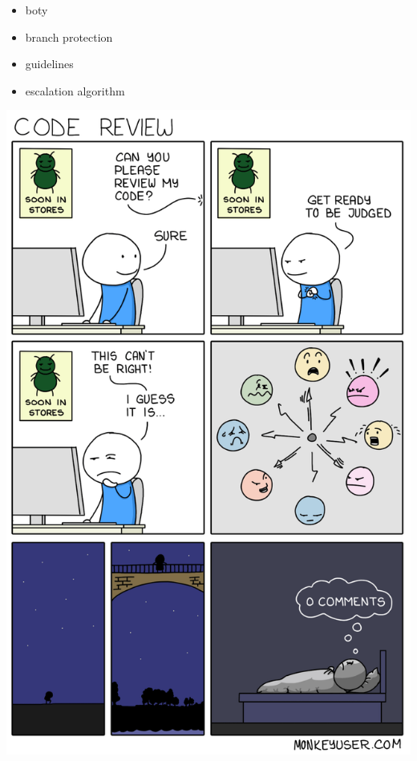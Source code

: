 \documentclass[xcolor=dvipsnames]{beamer}%
\begin{document}
\begin{frame}
	\begin{itemize}
		\item boty
		\item branch protection
		\item guidelines
		\item escalation algorithm
	\end{itemize}
\end{frame}


\begin{frame}
	\includegraphics[width=\textwidth,height=\textheight,keepaspectratio]{figure/no_comments.png}
\end{frame}
\end{document}
